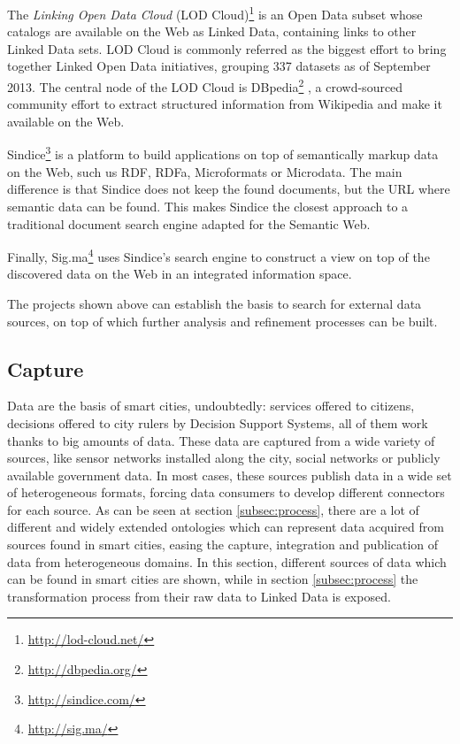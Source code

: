 The \textit{Linking Open Data Cloud} (LOD Cloud)\footnote{\url{http://lod-cloud.net/}} is an Open Data subset whose catalogs are available on the Web as Linked Data, containing links to other Linked Data sets. LOD Cloud is commonly referred as the biggest effort to bring together Linked Open Data initiatives, grouping 337 datasets as of September 2013. The central node of the LOD Cloud is DBpedia\footnote{\url{http://dbpedia.org/}} \cite{auer2007dbpedia,bizer2009dbpedia}, a crowd-sourced community effort to extract structured information from Wikipedia and make it available on the Web.

Sindice\footnote{\url{http://sindice.com/}} \cite{tummarello2007sindice} is a platform to build applications on top of semantically markup data on the Web, such us RDF, RDFa, Microformats or Microdata. The main difference is that Sindice does not keep the found documents, but the URL where semantic data can be found. This makes Sindice the closest approach to a traditional document search engine adapted for the Semantic Web.

Finally, Sig.ma\footnote{\url{http://sig.ma/}} \cite{tummarello2010sig} uses Sindice's search engine to construct a view on top of the discovered data on the Web in an integrated information space.

The projects shown above can establish the basis to search for external data sources, on top of which further analysis and refinement processes can be built.

\subsection{Capture}
\label{sec:capture}

Data are the basis of smart cities, undoubtedly: services offered to citizens, decisions offered to city rulers by Decision Support Systems, all of them work thanks to big amounts of data. These data are captured from a wide variety of sources, like sensor networks installed along the city, social networks or publicly available government data. In most cases, these sources publish data in a wide set of heterogeneous formats, forcing data consumers to develop different connectors for each source. As can be seen at section \ref{subsec:process}, there are a lot of different and widely extended ontologies which can represent data acquired from sources found in smart cities, easing the capture, integration and publication of data from heterogeneous domains. In this section, different sources of data which can be found in smart cities are shown, while in section \ref{subsec:process} the transformation process from their raw data to Linked Data is exposed.

